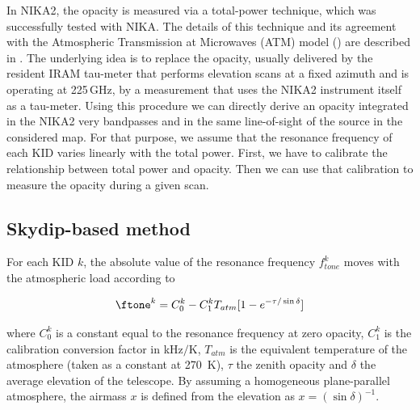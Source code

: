%
%


In NIKA2, the opacity is measured via a total-power technique, which was
successfully tested with NIKA. The details of this technique and its agreement
with the Atmospheric Transmission at Microwaves (ATM) model
(\cite{2001IEEE....49.1683C}) are described in \cite{Catalano:2014nml}. The
underlying idea is to replace the opacity, usually delivered by the resident
IRAM tau-meter that performs elevation scans at a fixed azimuth and is
operating at 225\,GHz, by a measurement that uses the NIKA2 instrument itself
as a tau-meter. Using this procedure we can directly derive an opacity
integrated in the NIKA2 very bandpasses and in the same line-of-sight of the
source in the considered map. For that purpose, we assume that the resonance
frequency of each KID varies linearly with the total power. First, we have to
calibrate the relationship between total power and opacity. Then we can use
that calibration to measure the opacity during a given scan.


\subsection{Skydip-based method}
\label{se:skydip-method}

For each KID $k$, the absolute value of the resonance frequency
$f_{tone}^k$ moves with the atmospheric load according to

\begin{equation}
\ftone^k  = C_0^k - C_1^k T_{atm}[1-e^{-\tau/\sin\delta}]
\label{eq:skydip}
\end{equation}


where $C_0^k$ is a constant equal to the resonance
frequency at zero opacity, $C_1^k$ is the calibration conversion
factor in kHz$/$K, $T_{atm}$ is the equivalent temperature
of the atmosphere (taken as a constant at 270~K), $\tau$ the zenith
opacity and $\delta$ the average elevation of the telescope.
By assuming a homogeneous plane-parallel atmosphere, the airmass $x$ is defined from the
elevation as $x = \left(\sin\delta\right)^{-1}$. 

